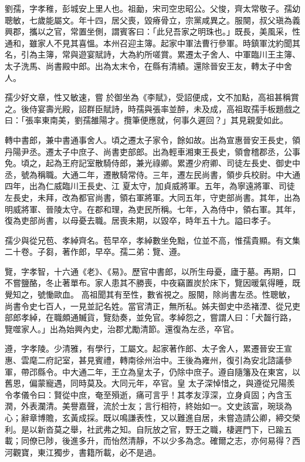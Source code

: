 \begin{pinyinscope}
 劉孺，字孝稚，彭城安上里人也。祖勔，宋司空忠昭公。父悛，齊太常敬子。孺幼聰敏，七歲能屬文。年十四，居父喪，毀瘠骨立，宗黨咸異之。服闋，叔父瑱為義興郡，攜以之官，常置坐側，謂賓客曰：「此兒吾家之明珠也。」既長，美風采，性通和，雖家人不見其喜慍。本州召迎主簿。起家中軍法曹行參軍。時鎮軍沈約聞其名，引為主簿，常與遊宴賦詩，大為約所嗟賞。累遷太子舍人、中軍臨川王主簿、太子洗馬、尚書殿中郎。出為太末令，在縣有清績。還除晉安王友，轉太子中舍人。



 孺少好文章，性又敏速，嘗
 於御坐為《李賦》，受詔便成，文不加點，高祖甚稱賞之。後侍宴壽光殿，詔群臣賦詩，時孺與張率並醉，未及成，高祖取孺手板題戲之曰：「張率東南美，劉孺雒陽才。攬筆便應就，何事久遲回？」其見親愛如此。



 轉中書郎，兼中書通事舍人。頃之遷太子家令，餘如故。出為宣惠晉安王長史，領丹陽尹丞。遷太子中庶子、尚書吏部郎。出為輕車湘東王長史，領會稽郡丞，公事免。頃之，起為王府記室散騎侍郎，兼光祿卿。累遷少府卿、司徒左長史、御史中丞，號為稱職。大通二年，遷散騎常侍。三年，遷左民尚書，領步兵校尉。中大通四年，出為仁威臨川王長史、江
 夏太守，加貞威將軍。五年，為寧遠將軍、司徒左長史，未拜，改為都官尚書，領右軍將軍。大同五年，守吏部尚書。其年，出為明威將軍、晉陵太守。在郡和理，為吏民所稱。七年，入為侍中，領右軍。其年，復為吏部尚書，以母憂去職。居喪未期，以毀卒，時年五十九。謚曰孝子。



 孺少與從兄苞、孝綽齊名。苞早卒，孝綽數坐免黜，位並不高，惟孺貴顯。有文集二十卷。子芻，著作郎，早卒。孺二弟：覽、遵。



 覽，字孝智，十六通《老》、《易》。歷官中書郎，以所生母憂，廬于墓。再期，口不嘗鹽酪，冬止著單布。家人患其不勝喪，中夜竊置炭於床下，覽因暖氣得睡，既覺知之，號慟歐血。
 高祖聞其有至性，數省視之。服闋，除尚書左丞。性聰敏，尚書令史七百人，一見並記名姓。當官清正，無所私。姊夫御史中丞褚湮、從兄吏部郎孝綽，在職頗通贓貨，覽劾奏，並免官。孝綽怨之，嘗謂人曰：「犬齧行路，覽噬家人。」出為始興內史，治郡尤勵清節。還復為左丞，卒官。



 遵，字孝陵。少清雅，有學行，工屬文。起家著作郎、太子舍人，累遷晉安王宣惠、雲麾二府記室，甚見賓禮，轉南徐州治中。王後為雍州，復引為安北諮議參軍，帶邔縣令。中大通二年，王立為皇太子，仍除中庶子。遵自隨籓及在東宮，以舊恩，偏蒙寵遇，同時莫及。大同元年，卒官。皇
 太子深悼惜之，與遵從兄陽羨令孝儀令曰：賢從中庶，奄至殞逝，痛可言乎！其孝友淳深，立身貞固；內含玉潤，外表瀾清。美譽嘉聲，流於士友；言行相符，終始如一。文史該富，琬琰為心；辭章博贍，玄黃成採。既以鳴謙表性，又以難進自居，未嘗造請公卿，締交榮利。是以新沓莫之舉，社武弗之知。自阮放之官，野王之職，棲遲門下，已踰五載；同僚已陟，後進多升，而怡然清靜，不以少多為念。確爾之志，亦何易得？西河觀寶，東江獨步，書籍所載，必不是過。




\end{pinyinscope}
